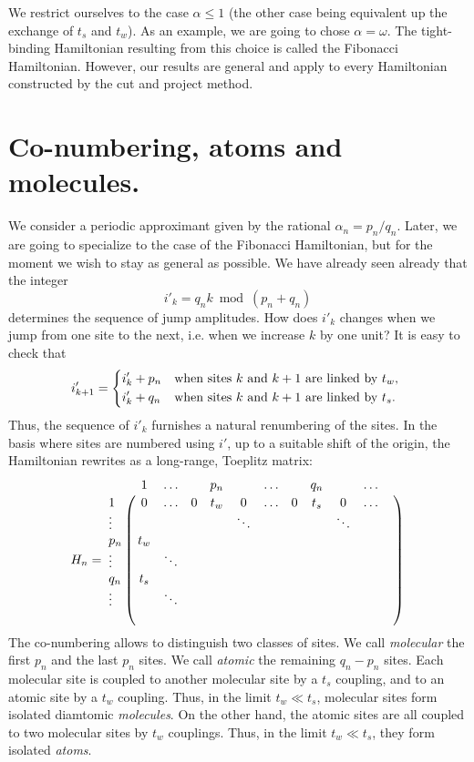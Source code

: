 \documentclass[11pt]{article}
\begin{document}
We restrict ourselves to the case $\alpha \leq 1$ (the other case being equivalent up the exchange of $t_s$ and $t_w$). As an example, we are going to chose $\alpha = \omega$. The tight-binding Hamiltonian resulting from this choice is called the Fibonacci Hamiltonian.
However, our results are general and apply to every Hamiltonian constructed by the cut and project method.

\section{Co-numbering, atoms and molecules.}

We consider a periodic approximant given by the rational $\alpha_n = p_n/q_n$. Later, we are going to specialize to the case of the Fibonacci Hamiltonian, but for the moment we wish to stay as general as possible.
We have already seen already that the integer
\begin{equation}
	i'_k = q_n k \bmod(p_n+q_n)
\end{equation}
determines the sequence of jump amplitudes. How does $i'_k$ changes when we jump from one site to the next, i.e. when we increase $k$ by one unit? It is easy to check that
\begin{equation}
	i'_{k+1} = \begin{dcases*}
	i'_k + p_n & when sites $k$ and $k+1$ are linked by $t_w$, \\
	i'_k + q_n & when sites $k$ and $k+1$ are linked by $t_s$.
	\end{dcases*}
\end{equation}
Thus, the sequence of $i'_k$ furnishes a natural renumbering of the sites.
In the basis where sites are numbered using $i'$, up to a suitable shift of the origin, the Hamiltonian rewrites as a long-range, Toeplitz matrix:
\begin{equation}
	H_n = 
	\bordermatrix{ 
	 	& 1 	&	\ldots & & p_n	& &  \ldots &	& q_n &	& \ldots	&  \cr
    1 	& 0 		& \ldots & 0 & t_w & 0	& \ldots & 0 & t_s	& 0 		& \ldots		 \cr
    \vdots & & & & & \ddots	& & & & \ddots & \cr
    p_n & t_w \cr
    \vdots & & \ddots \cr
    q_n & t_s \cr
    \vdots & & \ddots \cr
     & 
    }
\end{equation}
The co-numbering allows to distinguish two classes of sites. We call \emph{molecular} the first $p_n$ and the last $p_n$ sites. We call \emph{atomic} the remaining $q_n - p_n$ sites.
Each molecular site is coupled to another molecular site by a $t_s$ coupling, and to an atomic site by a $t_w$ coupling. Thus, in the limit $t_w \ll t_s$, molecular sites form isolated diamtomic \emph{molecules}. 
On the other hand, the atomic sites are all coupled to two molecular sites by $t_w$ couplings. Thus, in the limit $t_w \ll t_s$, they form isolated \emph{atoms}.
\end{document}

